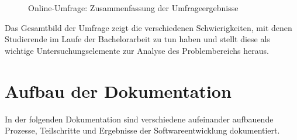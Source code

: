 \documentclass[bibliography=totoc,listof=totoc,BCOR=5mm,DIV=12,oneside]{scrbook}
\begin{document}
\bigskip
\begin{figure}[H]

	
	\vspace{1.5cm}
	
	\vspace{1.5cm}
	
	\caption{Online-Umfrage: Zusammenfassung der Umfrageergebnisse}
	\label{img:zusammenfassungOnlineUmfrage}
\end{figure}

\par \bigskip Das Gesamtbild der Umfrage zeigt die verschiedenen Schwierigkeiten, mit denen Studierende im Laufe der Bachelorarbeit zu tun haben und stellt diese als wichtige Untersuchungselemente zur Analyse des Problembereichs heraus.

\newpage
\section{Aufbau der Dokumentation}
\par In der folgenden Dokumentation sind verschiedene aufeinander aufbauende Prozesse, Teilschritte und Ergebnisse der Softwareentwicklung dokumentiert. 
\end{document}
